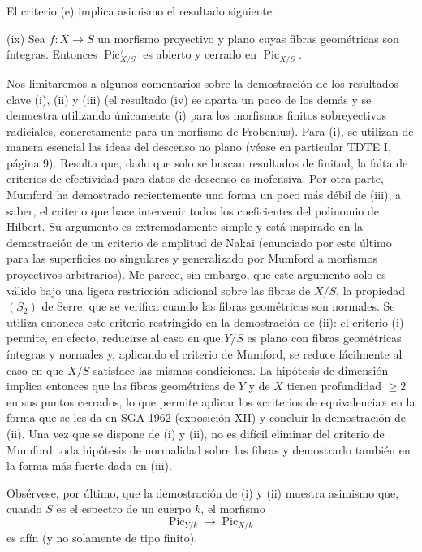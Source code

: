 \documentclass[11pt,twoside,openany]{book}
\numberwithin{equation}{section}
\newcommand{\src}[1]{%
  \phantomsection\hypertarget{src:#1}{}%
  \marginpar{\raggedleft\footnotesize\sffamily #1}%
}
\theoremstyle{plain}
\theoremstyle{definition}
\theoremstyle{remark}
\newcommand{\FgaUnitKey}{frontmatter}
\renewcommand{\src}[1]{%
  \phantomsection\hypertarget{src:\FgaUnitKey:#1}{}%
  \marginpar{\raggedleft\footnotesize\sffamily #1}%
}
\theoremstyle{plain}
\theoremstyle{definition}
\theoremstyle{remark}
\begin{document}
El criterio (e) implica asimismo el resultado siguiente:

\medskip
\noindent(ix) Sea $f:X\longrightarrow S$ un morfismo proyectivo y plano cuyas
fibras geométricas son íntegras. Entonces $\operatorname{Pic}_{X/S}^\tau$ es
abierto y cerrado en $\operatorname{Pic}_{X/S}$.

Nos limitaremos a algunos comentarios sobre la demostración de los resultados
clave (i), (ii) y (iii) (el resultado (iv) se aparta un poco de los demás y se
demuestra utilizando únicamente (i) para los morfismos finitos sobreyectivos
radiciales, concretamente para un morfismo de Frobenius). Para (i), se
utilizan de manera esencial las ideas del descenso no plano (véase en
particular TDTE I, página 9). Resulta que, dado que solo se buscan resultados
de finitud, la falta de criterios de efectividad para datos de descenso es
inofensiva. Por otra parte, Mumford ha demostrado recientemente una forma un
poco más débil de (iii), a saber, el criterio que hace intervenir todos los
coeficientes del polinomio de Hilbert. Su argumento es extremadamente simple
y está inspirado en la demostración de un criterio de amplitud de Nakai
(enunciado por este último para las superficies no singulares y generalizado
por Mumford a morfismos proyectivos arbitrarios). Me parece, sin embargo, que
este argumento solo es válido bajo una ligera restricción adicional sobre las
fibras de $X/S$, la propiedad $(S_2)$ de Serre, que se verifica cuando las
fibras geométricas son normales. Se utiliza entonces este criterio restringido
en la demostración de (ii): el criterio (i) permite, en efecto, reducirse al
caso en que $Y/S$ es plano con fibras geométricas íntegras y normales y,
aplicando el criterio de Mumford, se reduce fácilmente al caso en que $X/S$
satisface las mismas condiciones. La hipótesis de dimensión implica entonces
que las fibras geométricas de $Y$ y de $X$ tienen profundidad $\geq2$ en sus
puntos cerrados, lo que permite aplicar los «criterios de equivalencia» en la
forma que se les da en SGA 1962 (exposición XII) y concluir la demostración de
(ii). Una vez que se dispone de (i) y (ii), no es difícil eliminar del criterio
de Mumford toda hipótesis de normalidad sobre las fibras y demostrarlo también
en la forma más fuerte dada en (iii).

\src{307}
Obsérvese, por último, que la demostración de (i) y (ii) muestra asimismo que,
cuando $S$ es el espectro de un cuerpo $k$, el morfismo
\[
\operatorname{Pic}_{Y/k}\longrightarrow\operatorname{Pic}_{X/k}
\]
es afín (y no solamente de tipo finito).
\end{document}
